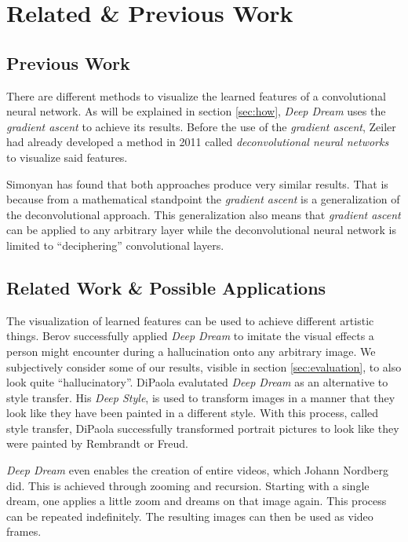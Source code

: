 \section{Related \& Previous Work}
\label{sec:previous-work}
\subsection{Previous Work}
There are different methods to visualize the learned features of a convolutional neural network.
As will be explained in section \ref{sec:how}, \textit{Deep Dream} uses the \textit{gradient ascent} to achieve its results.
Before the use of the \textit{gradient ascent}, Zeiler had already developed a method in 2011 called \emph{deconvolutional neural networks} to visualize said features.\cite{zeiler2011adaptive}

Simonyan has found that both approaches produce very similar results.
That is because from a mathematical standpoint the \textit{gradient ascent} is a generalization of the deconvolutional approach.
This generalization also means that \textit{gradient ascent} can be applied to any arbitrary layer while the deconvolutional neural network is limited to \enquote{deciphering} convolutional layers.\cite{simonyan2013deep}

\subsection{Related Work \& Possible Applications}
The visualization of learned features can be used to achieve different artistic things.
Berov successfully applied \textit{Deep Dream} to imitate the visual effects a person might encounter during a hallucination onto any arbitrary image.\cite{berov2016visual}
We subjectively consider some of our results, visible in section \ref{sec:evaluation}, to also look quite \enquote{hallucinatory}.
DiPaola evalutated \textit{Deep Dream} as an alternative to style transfer.
His \emph{Deep Style}, is used to transform images in a manner that they look like they have been painted in a different style.\cite{dipaola2016using}
With this process, called style transfer, DiPaola successfully transformed portrait pictures to look like they were painted by Rembrandt or Freud.

\emph{Deep Dream} even enables the creation of entire videos, which Johann Nordberg did.\cite{deep-dream-video}
This is achieved through zooming and recursion.
Starting with a single dream, one applies a little zoom and dreams on that image again.
This process can be repeated indefinitely.
The resulting images can then be used as video frames.

